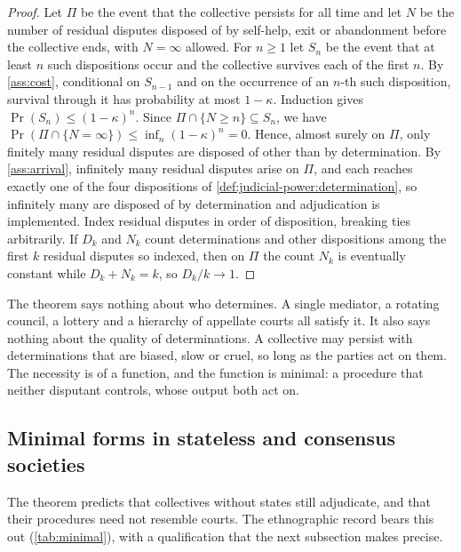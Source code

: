 \documentclass[11pt,letterpaper]{article}
\theoremstyle{definition}
\theoremstyle{remark}
\begin{document}
\begin{proof}
Let $\Pi$ be the event that the collective persists for all time and let $N$ be the number of residual disputes disposed of by self-help, exit or abandonment before the collective ends, with $N=\infty$ allowed. For $n\ge 1$ let $S_n$ be the event that at least $n$ such dispositions occur and the collective survives each of the first $n$. By \cref{ass:cost}, conditional on $S_{n-1}$ and on the occurrence of an $n$-th such disposition, survival through it has probability at most $1-\kappa$. Induction gives $\Pr(S_n)\le(1-\kappa)^n$. Since $\Pi\cap\{N\ge n\}\subseteq S_n$, we have $\Pr(\Pi\cap\{N=\infty\})\le\inf_n (1-\kappa)^n=0$. Hence, almost surely on $\Pi$, only finitely many residual disputes are disposed of other than by determination. By \cref{ass:arrival}, infinitely many residual disputes arise on $\Pi$, and each reaches exactly one of the four dispositions of \cref{def:judicial-power:determination}, so infinitely many are disposed of by determination and adjudication is implemented. Index residual disputes in order of disposition, breaking ties arbitrarily. If $D_k$ and $N_k$ count determinations and other dispositions among the first $k$ residual disputes so indexed, then on $\Pi$ the count $N_k$ is eventually constant while $D_k+N_k=k$, so $D_k/k\to 1$.
\end{proof}

The theorem says nothing about who determines. A single mediator, a rotating council, a lottery and a hierarchy of appellate courts all satisfy it. It also says nothing about the quality of determinations. A collective may persist with determinations that are biased, slow or cruel, so long as the parties act on them. The necessity is of a function, and the function is minimal: a procedure that neither disputant controls, whose output both act on.

\subsection{Minimal forms in stateless and consensus societies}

The theorem predicts that collectives without states still adjudicate, and that their procedures need not resemble courts. The ethnographic record bears this out (\cref{tab:minimal}), with a qualification that the next subsection makes precise.
\end{document}

